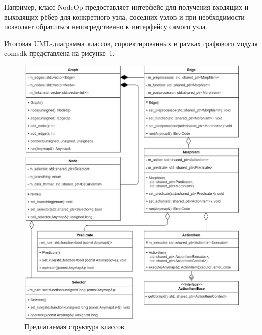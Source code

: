 Например, класс \textsf{NodeOp} предоставляет интерфейс для получения входящих и выходящих рёбер для конкретного узла, соседних узлов и при необходимости позволяет обратиться непосредственно к интерфейсу самого узла.

Итоговая UML-диаграмма классов, спроектированных в рамках графового модуля comsdk представлена на рисунке~\ref{fig:suggestedGraphStructure}.
\begin{figure}[!ht]
    \centering
    \includegraphics[width=\textwidth]{figures/suggested_structure.png}
    \caption{Предлагаемая структура классов}
    \label{fig:suggestedGraphStructure}
\end{figure}


